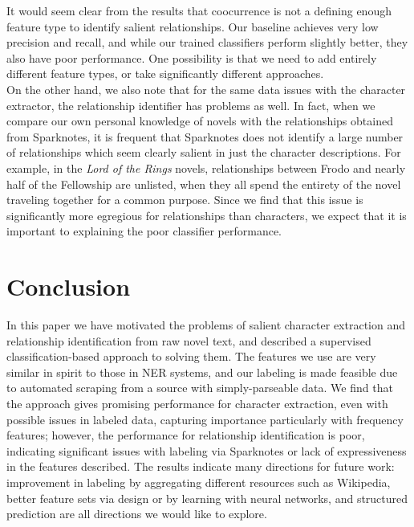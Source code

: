 \documentclass[12pt]{article}
\begin{document}

        It would seem clear from the results that coocurrence is not a defining enough feature type to
        identify salient relationships. Our baseline achieves very low precision and recall, and while
        our trained classifiers perform slightly better, they also have poor performance. One possibility
        is that we need to add entirely different feature types, or take significantly different
        approaches. \\

        On the other hand, we also note that for the same data issues with the character extractor,
        the relationship identifier has problems as well. In fact, when we compare our own personal
        knowledge of novels with the relationships obtained from Sparknotes, it is frequent that
        Sparknotes does not identify a large number of relationships which seem clearly salient in
        just the character descriptions. For example, in the \emph{Lord of the Rings} novels,
        relationships between Frodo and nearly half of the Fellowship are unlisted, when they all
        spend the entirety of the novel traveling together for a common purpose. Since we find that
        this issue is significantly more egregious for relationships than characters, we expect
        that it is important to explaining the poor classifier performance.

\section{Conclusion}

    In this paper we have motivated the problems of salient character extraction and relationship
    identification from raw novel text, and described a supervised classification-based approach to
    solving them. The features we use are very similar in spirit to those in NER systems,
    and our labeling is made feasible due to automated scraping from a source with simply-parseable
    data. We find that the approach gives promising performance for character extraction,
    even with possible issues in labeled data, capturing importance particularly with frequency
    features; however, the performance for relationship identification is poor, indicating
    significant issues with labeling via Sparknotes or lack of expressiveness in the features
    described. The results indicate many directions for future work: improvement in labeling
    by aggregating different resources such as Wikipedia, better feature sets via design or by
    learning with neural networks, and structured prediction are all directions we would like
    to explore.
\end{document}
